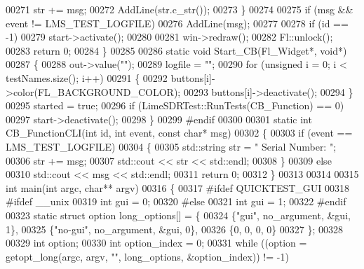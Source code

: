 \begin{DoxyCode}
00271         str += msg;
00272         AddLine(str.c\_str());
00273     \}
00274 
00275     \textcolor{keywordflow}{if} (msg && event != LMS_TEST_LOGFILE)
00276         AddLine(msg);
00277 
00278     \textcolor{keywordflow}{if} (\textcolor{keywordtype}{id} == -1)
00279     start->activate();
00280 
00281     win->redraw();
00282     Fl::unlock();
00283     \textcolor{keywordflow}{return} 0;
00284 \}
00285 
00286 \textcolor{keyword}{static} \textcolor{keywordtype}{void} Start\_CB(Fl\_Widget*, \textcolor{keywordtype}{void}*)
00287 \{
00288     out->value(\textcolor{stringliteral}{""});
00289     logfile = \textcolor{stringliteral}{""};
00290     \textcolor{keywordflow}{for} (\textcolor{keywordtype}{unsigned} i = 0; i < testNames.size(); i++)
00291     \{
00292         buttons[i]->color(FL\_BACKGROUND\_COLOR);
00293         buttons[i]->deactivate();
00294     \}
00295     started = \textcolor{keyword}{true};
00296     \textcolor{keywordflow}{if} (LimeSDRTest::RunTests(CB\_Function) == 0)
00297         start->deactivate();
00298 \}
00299 \textcolor{preprocessor}{#endif}
00300 
00301 \textcolor{keyword}{static} \textcolor{keywordtype}{int} CB_FunctionCLI(\textcolor{keywordtype}{int} \textcolor{keywordtype}{id}, \textcolor{keywordtype}{int} event, \textcolor{keyword}{const} \textcolor{keywordtype}{char}* msg)
00302 \{
00303     \textcolor{keywordflow}{if} (event == LMS_TEST_LOGFILE)
00304     \{
00305         std::string str = \textcolor{stringliteral}{"  Serial Number: "};
00306         str += msg;
00307         std::cout << str << std::endl;
00308     \}
00309     \textcolor{keywordflow}{else}
00310         std::cout << msg << std::endl;
00311     \textcolor{keywordflow}{return} 0;
00312 \}
00313 
00314 
00315 \textcolor{keywordtype}{int} main(\textcolor{keywordtype}{int} argc, \textcolor{keywordtype}{char}** argv)
00316 \{
00317 \textcolor{preprocessor}{#ifdef QUICKTEST\_GUI}
00318 \textcolor{preprocessor}{#ifdef \_\_unix}
00319     \textcolor{keywordtype}{int} gui = 0;
00320 \textcolor{preprocessor}{#else}
00321     \textcolor{keywordtype}{int} gui = 1;
00322 \textcolor{preprocessor}{#endif}
00323     \textcolor{keyword}{static} \textcolor{keyword}{struct }option long\_options[] = \{
00324         \{\textcolor{stringliteral}{"gui"}, no_argument, &gui, 1\},
00325         \{\textcolor{stringliteral}{"no-gui"}, no_argument, &gui, 0\},
00326         \{0, 0, 0, 0\}
00327     \};
00328 
00329     \textcolor{keywordtype}{int} option;
00330     \textcolor{keywordtype}{int} option\_index = 0;
00331     \textcolor{keywordflow}{while} ((option = getopt_long(argc, argv, \textcolor{stringliteral}{""}, long\_options, &option\_index)) != -1)

\end{DoxyCode}
